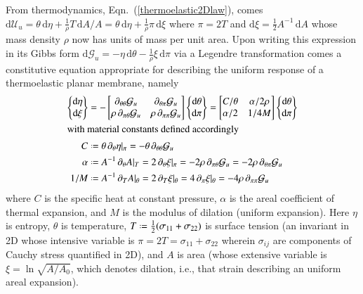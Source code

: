 From thermo\-dynamics, Eqn.~(\ref{thermoelastic2Dlaw}), comes $\mathrm{d}\mathcal{U}_u = \theta \, \mathrm{d} \eta + \tfrac{1}{\rho} T \, \mathrm{d}A / \! A = \theta \, \mathrm{d} \eta + \tfrac{1}{\rho} \pi \, \mathrm{d}\xi$ where $\pi = 2T$ and $\mathrm{d}\xi = \tfrac{1}{2} A^{-1} \, \mathrm{d}A$ whose mass density $\rho$ now has units of mass per unit area.  Upon writing this expression in its Gibbs form $\mathrm{d} \mathcal{G}_u = -\eta \, \mathrm{d} \theta - \tfrac{1}{\rho} \xi \, \mathrm{d} \pi$ via a Legendre transformation comes a constitutive equation appropriate for describing the uniform response of a thermo\-elastic planar membrane, namely
\begin{subequations}
    \label{uniformMembraneModel}
    \begin{align}
\left\{ \begin{matrix}
\mathrm{d} \eta \\ \mathrm{d} \xi
\end{matrix} \right\} & = -\begin{bmatrix}
\partial_{\theta\theta} \mathcal{G}_u & \partial_{\theta\pi} \mathcal{G}_u \\
\rho \, \partial_{\pi\theta} \mathcal{G}_u & \rho \, \partial_{\pi\pi} \mathcal{G}_u
\end{bmatrix} 
\left\{ \begin{matrix}
\mathrm{d} \theta \\ \mathrm{d} \pi
\end{matrix} \right\} = \begin{bmatrix}
C / \theta & \alpha / 2 \rho \\ \alpha / 2 & 1 / 4 M
\end{bmatrix} \left\{ \begin{matrix}
\mathrm{d} \theta \\ \mathrm{d} \pi
\end{matrix} \right\}
\label{thermoelasticCE2D} \\
\intertext{with material constants defined accordingly}
    C & \defeq \theta \, \partial_{\theta} \eta |_{\pi} = -\theta \, \partial_{\theta\theta} \mathcal{G}_u \\
    \alpha & \defeq A^{-1} \, \partial_{\theta} A |_T = 2 \, \partial_{\theta} \xi |_{\pi} = -2\rho \, \partial_{\pi\theta} \mathcal{G}_u = -2\rho \, \partial_{\theta\pi} \mathcal{G}_u \\
    1/M & \defeq A^{-1} \, \partial_T A |_{\theta} = 2 \, \partial_T \xi |_{\theta} = 4 \, \partial_{\pi} \xi |_{\theta} = -4\rho \, \partial_{\pi\pi} \mathcal{G}_u
    \end{align}
\end{subequations}
where $C$ is the specific heat at constant pressure, $\alpha$ is the areal coefficient of thermal expansion, and $M$ is the modulus of dilation (uniform expansion).  Here $\eta$ is entropy, $\theta$ is temperature, $T \defeq \tfrac{1}{2} ( \sigma_{11} + \sigma_{22})$ is surface tension (an invariant in 2D whose intensive variable is $\pi = 2T = \sigma_{11} + \sigma_{22}$ wherein $\sigma_{ij}$ are components of Cauchy stress quantified in 2D), and $A$ is area (whose extensive variable is $\xi = \ln \sqrt{A / \! A_0}$, which denotes dilation, i.e., that strain describing an uniform areal expansion).  

